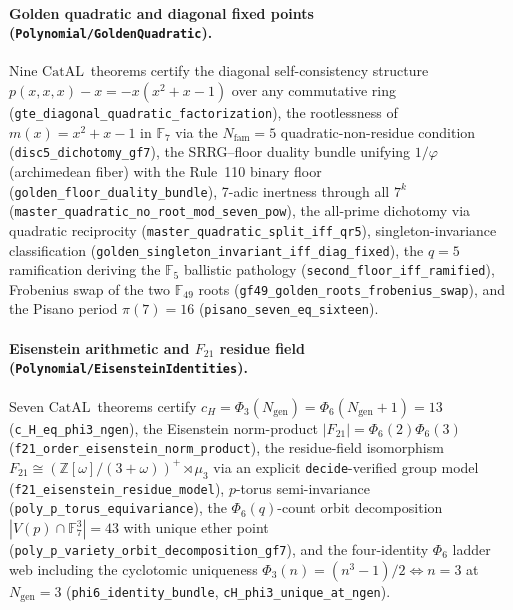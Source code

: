 \documentclass[11pt,a4paper]{article}
\theoremstyle{definition}
\newcommand{\CatAL}{\ensuremath{\mathrm{CatAL}}}
\begin{document}
\paragraph{Golden quadratic and diagonal fixed points
  (\texttt{Polynomial/\allowbreak GoldenQuadratic}).}
Nine \CatAL\ theorems certify the diagonal self-consistency structure
$p(x,x,x)-x = -x(x^2+x-1)$ over any commutative ring
(\texttt{gte\_diagonal\_quadratic\_factorization}),
the rootlessness of $m(x)=x^2+x-1$ in $\mathbb{F}_7$ via the
$N_{\mathrm{fam}}=5$ quadratic-non-residue condition
(\texttt{disc5\_dichotomy\_gf7}),
the SRRG--floor duality bundle unifying $1/\varphi$ (archimedean fiber) with
the Rule~110 binary floor (\texttt{golden\_floor\_duality\_bundle}),
7-adic inertness through all $7^k$
(\texttt{master\_quadratic\_no\_root\_mod\_seven\_pow}),
the all-prime dichotomy via quadratic reciprocity
(\texttt{master\_quadratic\_split\_iff\_qr5}),
singleton-invariance classification
(\texttt{golden\_singleton\_invariant\_iff\_diag\_fixed}),
the $q{=}5$ ramification deriving the $\mathbb{F}_5$ ballistic pathology
(\texttt{second\_floor\_iff\_ramified}),
Frobenius swap of the two $\mathbb{F}_{49}$ roots
(\texttt{gf49\_golden\_roots\_frobenius\_swap}),
and the Pisano period $\pi(7)=16$
(\texttt{pisano\_seven\_eq\_sixteen}).

\paragraph{Eisenstein arithmetic and $F_{21}$ residue field
  (\texttt{Polynomial/\allowbreak EisensteinIdentities}).}
Seven \CatAL\ theorems certify $c_H = \Phi_3(N_{\mathrm{gen}}) =
\Phi_6(N_{\mathrm{gen}}{+}1) = 13$
(\texttt{c\_H\_eq\_phi3\_ngen}),
the Eisenstein norm-product $|F_{21}|=\Phi_6(2)\Phi_6(3)$
(\texttt{f21\_order\_eisenstein\_norm\_product}),
the residue-field isomorphism $F_{21}\cong(\mathbb{Z}[\omega]/(3{+}\omega))^+
\rtimes\mu_3$ via an explicit \texttt{decide}-verified group model
(\texttt{f21\_eisenstein\_residue\_model}),
$p$-torus semi-invariance
(\texttt{poly\_p\_torus\_equivariance}),
the $\Phi_6(q)$-count orbit decomposition $|V(p)\cap\mathbb{F}_7^3|=43$
with unique ether point (\texttt{poly\_p\_variety\_orbit\_decomposition\_gf7}),
and the four-identity $\Phi_6$ ladder web including the cyclotomic uniqueness
$\Phi_3(n)=(n^3{-}1)/2\iff n=3$ at $N_{\mathrm{gen}}=3$
(\texttt{phi6\_identity\_bundle}, \texttt{cH\_phi3\_unique\_at\_ngen}).
\end{document}

